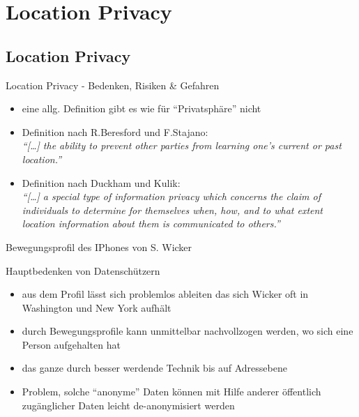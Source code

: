\section{Location Privacy}
\subsection{Location Privacy}
\begin{frame}{Location Privacy - Bedenken, Risiken \& Gefahren}
\begin{itemize}
  \item eine allg. Definition gibt es wie für "`Privatsphäre"' nicht
  \item Definition nach R.Beresford und F.Stajano:\\ \vspace{.5cm}
  \textit{"`[\dots] the ability to prevent other parties from learning one’s current or past location."'}
  \vspace{.5cm}
  \item Definition nach Duckham und Kulik:\\ \vspace{.5cm}
  \textit{"`[\dots] a special type of information privacy which concerns the claim of individuals to determine for themselves when, how, and to what extent location information about them is communicated to others."'}
\end{itemize}
\end{frame}

\begin{frame}{Bewegungsprofil des IPhones von S. Wicker}
  \begin{center}
  \end{center}
\end{frame}

\begin{frame}{Hauptbedenken von Datenschützern}
  \begin{itemize}
  \item aus dem Profil lässt sich problemlos ableiten das sich Wicker oft in Washington und New York aufhält
  \item durch Bewegungsprofile kann unmittelbar nachvollzogen werden, wo sich eine Person aufgehalten hat
  \item das ganze durch besser werdende Technik bis auf Adressebene
  \item Problem, solche "`anonyme"' Daten können mit Hilfe anderer öffentlich zugänglicher Daten leicht de-anonymisiert werden
  \end{itemize}
\end{frame}

